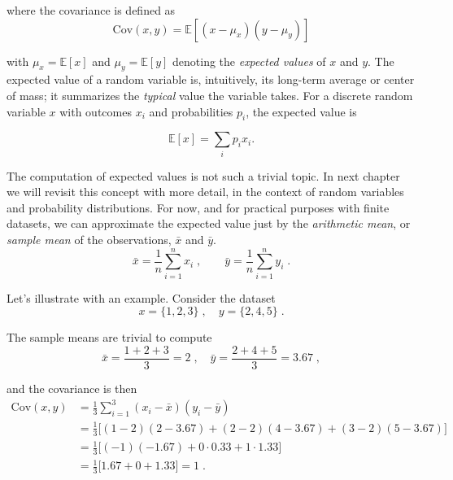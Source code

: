 \documentclass{book}
\begin{document}
where the covariance is defined as
\begin{equation}
    \mathrm{Cov}(x, y) = \mathbb{E}[(x - \mu_x)(y - \mu_y)]
    \label{eq:covariance}
\end{equation}

with $\mu_x = \mathbb{E}[x]$ and $\mu_y = \mathbb{E}[y]$ denoting the \textit{expected values} of $x$ and $y$. The expected value of a random variable is, intuitively, its long-term average or center of mass; it summarizes the \textit{typical} value the variable takes. For a discrete random variable $x$ with outcomes $x_i$ and probabilities $p_i$, the expected value is  

\begin{equation}
	\mathbb{E}[x] = \sum_i p_i x_i.
	\label{eq:expected_value}
\end{equation}

The computation of expected values is not such a trivial topic. In next chapter we will revisit this concept with more detail, in the context of random variables and probability distributions. For now, and for practical purposes with finite datasets, we can approximate the expected value just by the \textit{arithmetic mean}, or \textit{sample mean} of the observations, $\bar{x}$ and $\bar{y}$. 
\begin{equation}
	\bar{x} = \frac{1}{n} \sum_{i=1}^{n} x_i \; , \qquad \bar{y} = \frac{1}{n} \sum_{i=1}^{n} y_i \; . \nonumber
\end{equation}

Let's illustrate with an example. Consider the dataset  
\begin{equation}
	x = \{1, 2, 3\} \; , \quad y = \{2, 4, 5\} \; .
\end{equation}

The sample means are trivial to compute
\begin{equation}
	\bar{x} = \frac{1 + 2 + 3}{3} = 2 \; , \quad 
	\bar{y} = \frac{2 + 4 + 5}{3} = 3.67 \; , \nonumber
\end{equation}

and the covariance is then
\begin{align}
	\mathrm{Cov}(x, y) 
	&= \frac{1}{3} \sum_{i=1}^3 (x_i - \bar{x})(y_i - \bar{y}) \nonumber \\[2mm]
	&= \frac{1}{3} \Big[ (1-2)(2-3.67) + (2-2)(4-3.67) + (3-2)(5-3.67) \Big] \nonumber \\[1mm]
	&= \frac{1}{3} \Big[ (-1)(-1.67) + 0 \cdot 0.33 + 1 \cdot 1.33 \Big] \nonumber \\[1mm]
	&= \frac{1}{3} \big[ 1.67 + 0 + 1.33 \big] = 1 \; .\nonumber
\end{align}
\end{document}
